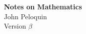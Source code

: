 %
%
%
\begin{center}
\textbf{\Huge Notes on Mathematics}\\
\bigskip
\bigskip
\bigskip
{\Large John Peloquin}\\
\bigskip
\bigskip
\bigskip
Version \(\beta\)
\end{center}
\newpage